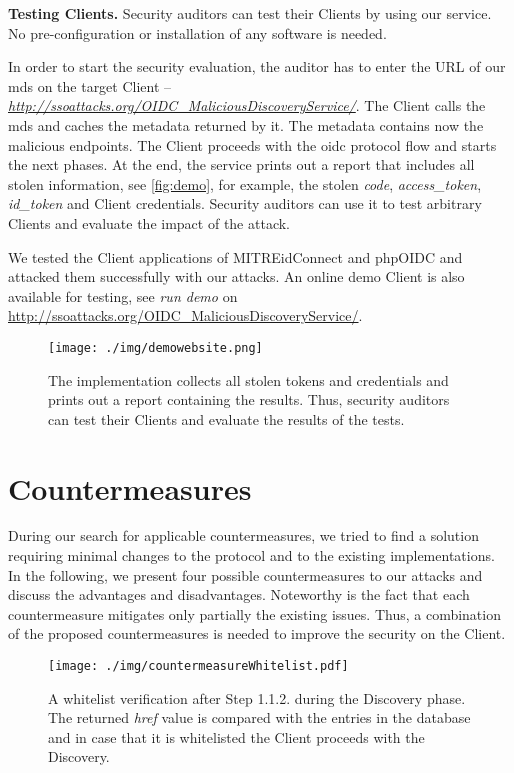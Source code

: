 \documentclass[conference,compsoc]{IEEEtran}
\renewcommand*{\paragraph}[1]{\vspace{2mm}\noindent\textbf{#1.}}
\begin{document}
\paragraph{Testing Clients}
Security auditors can test their Clients by using our service. 
No pre-configuration or installation of any software is needed.

In order to start the security evaluation, the auditor has to enter the URL of our \gls{mds} on the target Client -- \emph{\url{http://ssoattacks.org/OIDC_MaliciousDiscoveryService/}}.
The Client calls the \gls{mds} and caches the metadata returned by it. The metadata contains now the malicious endpoints.
The Client proceeds with the \gls{oidc} protocol flow and starts the next phases.
At the end, the service prints out a report that includes all stolen information, see \autoref{fig:demo}, for example, the stolen \emph{code}, \emph{access\_token}, \emph{id\_token} and Client credentials.
Security auditors can use it to test arbitrary Clients and evaluate the impact of the attack.

We tested the Client applications of MITREidConnect and phpOIDC and attacked them successfully with our attacks.
An online demo Client is also available for testing, see \emph{run demo} on \url{http://ssoattacks.org/OIDC_MaliciousDiscoveryService/}.

\begin{figure}[!ht]
	\centering
	\texttt{[image: ./img/demowebsite.png]}
\caption{The implementation collects all stolen tokens and credentials and prints out a report containing the results. Thus, security auditors can test their Clients and evaluate the results of the tests.}
	\label{fig:demo}
\end{figure} 

\section{Countermeasures}

During our search for applicable countermeasures, we tried to find a solution requiring minimal changes to the protocol and to the existing implementations.
In the following, we present four possible countermeasures to our attacks and discuss the advantages and disadvantages.
Noteworthy is the fact that each countermeasure mitigates only partially the existing issues. Thus, a combination of the proposed countermeasures is needed to improve the security on the Client.


\begin{figure}[!ht]
	\centering
	\texttt{[image: ./img/countermeasureWhitelist.pdf]}
\caption{A whitelist verification after Step 1.1.2. during the Discovery phase. The returned \emph{href} value is compared with the entries in the database and in case that it is whitelisted the Client proceeds with the Discovery.}
	\label{fig:countermeasurewhitelist}
\end{figure}
\end{document}
